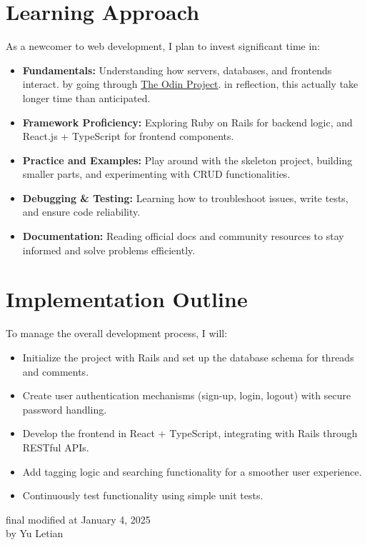 \documentclass[a4paper,12pt]{article}
\begin{document}
\begin{multicols}{2}
\section{Learning Approach}
As a newcomer to web development, I plan to invest significant time in:
\begin{itemize}[leftmargin=1em]
    \item \textbf{Fundamentals:}  
        Understanding how servers, databases, and frontends interact. by going through \href{https://www.theodinproject.com/paths/foundations/courses/foundations}{The Odin Project}. in reflection, this actually take longer time than anticipated.
    \item \textbf{Framework Proficiency:}  
        Exploring Ruby on Rails for backend logic, and React.js + TypeScript for frontend components.  
    \item \textbf{Practice and Examples:}  
        Play around with the skeleton project, building smaller parts, and experimenting with CRUD functionalities.  
    \item \textbf{Debugging \& Testing:}  
        Learning how to troubleshoot issues, write tests, and ensure code reliability.  
    \item \textbf{Documentation:}  
        Reading official docs and community resources to stay informed and solve problems efficiently.
\end{itemize}

\section{Implementation Outline}
To manage the overall development process, I will:
\begin{itemize}
    \item Initialize the project with Rails and set up the database schema for threads and comments.
    \item Create user authentication mechanisms (sign-up, login, logout) with secure password handling.
    \item Develop the frontend in React + TypeScript, integrating with Rails through RESTful APIs.
    \item Add tagging logic and searching functionality for a smoother user experience.
    \item Continuously test functionality using simple unit tests.
\end{itemize}

\noindent final modified at January 4, 2025 \\ by Yu Letian

\end{multicols}
\end{document}
